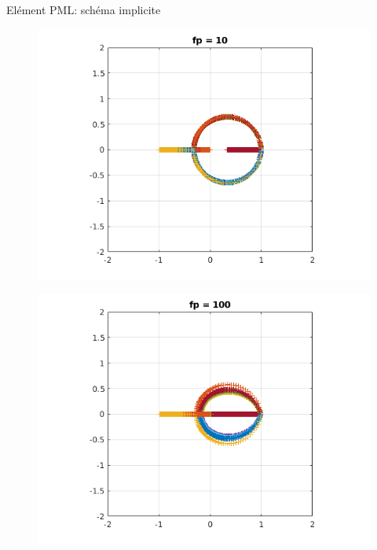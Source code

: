 \begin{frame}{Elément PML: schéma implicite}
\begin{figure}[ht]
\begin{minipage}[b]{0.5\linewidth}
  \end{minipage}%
  \begin{minipage}[b]{0.5\linewidth}
    \centering
    \includegraphics[scale=.34]{images/eig_imp_pml10.png} \\
  \end{minipage} 
  \begin{minipage}[b]{0.5\linewidth}
    \centering
    \includegraphics[scale=.34]{images/eig_imp_pml100.png} \\
  \end{minipage}%

\end{figure}
\end{frame}

